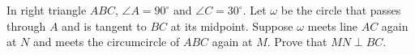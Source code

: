 In right triangle $ABC$, $\angle A=90^\circ$ and $\angle C=30^\circ$. Let $\omega$ be the circle that passes through $A$ and is tangent to $BC$ at its midpoint. Suppose $\omega$ meets line $AC$ again at $N$ and meets the circumcircle of $ABC$ again at $M$. Prove that $MN\perp BC$.
